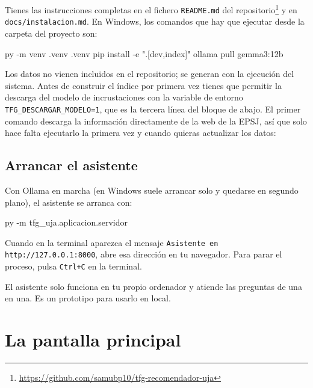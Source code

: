 \documentclass[12pt, a4paper]{article}
\let\textttOriginal\texttt
\renewcommand{\texttt}[1]{\textttOriginal{\textcolor{codigoEnLinea}{#1}}}
\begin{document}
Tienes las instrucciones completas en el fichero \texttt{README.md} del repositorio\footnote{\url{https://github.com/samubp10/tfg-recomendador-uja}} y en \texttt{docs/\allowbreak instalacion.md}. En Windows, los comandos que hay que ejecutar desde la carpeta del proyecto son:

\begin{consola}
py -m venv .venv
.venv\Scripts\activate
pip install -e ".[dev,index]"
ollama pull gemma3:12b
\end{consola}

Los datos no vienen incluidos en el repositorio; se generan con la ejecución del sistema. Antes de construir el índice por primera vez tienes que permitir la descarga del modelo de incrustaciones con la variable de entorno \texttt{TFG\_DESCARGAR\_MODELO=1}, que es la tercera línea del bloque de abajo. El primer comando descarga la información directamente de la web de la EPSJ, así que solo hace falta ejecutarlo la primera vez y cuando quieras actualizar los datos:


\subsection[Arrancar el asistente]{Arrancar el asistente}\label{sec:arrancar}

Con Ollama en marcha (en Windows suele arrancar solo y quedarse en segundo plano), el asistente se arranca con:

\begin{consola}
py -m tfg_uja.aplicacion.servidor
\end{consola}

Cuando en la terminal aparezca el mensaje \texttt{Asistente en http://127.0.0.1:8000}, abre esa dirección en tu navegador. Para parar el proceso, pulsa \texttt{Ctrl+C} en la terminal.

El asistente solo funciona en tu propio ordenador y atiende las preguntas de una en una. Es un prototipo para usarlo en local.

\section[La pantalla principal]{La pantalla principal}\label{sec:pantalla}
\end{document}
